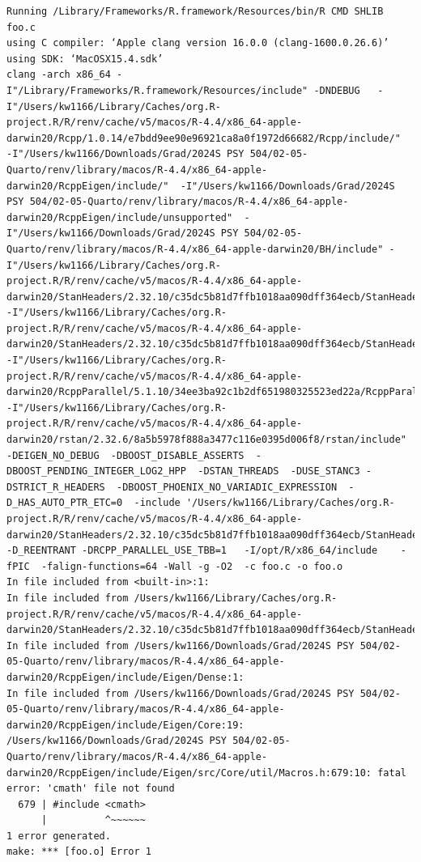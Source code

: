 \documentclass[
  letterpaper,
  DIV=11,
  numbers=noendperiod]{scrartcl}
\begin{document}
\begin{verbatim}
Running /Library/Frameworks/R.framework/Resources/bin/R CMD SHLIB foo.c
using C compiler: ‘Apple clang version 16.0.0 (clang-1600.0.26.6)’
using SDK: ‘MacOSX15.4.sdk’
clang -arch x86_64 -I"/Library/Frameworks/R.framework/Resources/include" -DNDEBUG   -I"/Users/kw1166/Library/Caches/org.R-project.R/R/renv/cache/v5/macos/R-4.4/x86_64-apple-darwin20/Rcpp/1.0.14/e7bdd9ee90e96921ca8a0f1972d66682/Rcpp/include/"  -I"/Users/kw1166/Downloads/Grad/2024S PSY 504/02-05-Quarto/renv/library/macos/R-4.4/x86_64-apple-darwin20/RcppEigen/include/"  -I"/Users/kw1166/Downloads/Grad/2024S PSY 504/02-05-Quarto/renv/library/macos/R-4.4/x86_64-apple-darwin20/RcppEigen/include/unsupported"  -I"/Users/kw1166/Downloads/Grad/2024S PSY 504/02-05-Quarto/renv/library/macos/R-4.4/x86_64-apple-darwin20/BH/include" -I"/Users/kw1166/Library/Caches/org.R-project.R/R/renv/cache/v5/macos/R-4.4/x86_64-apple-darwin20/StanHeaders/2.32.10/c35dc5b81d7ffb1018aa090dff364ecb/StanHeaders/include/src/"  -I"/Users/kw1166/Library/Caches/org.R-project.R/R/renv/cache/v5/macos/R-4.4/x86_64-apple-darwin20/StanHeaders/2.32.10/c35dc5b81d7ffb1018aa090dff364ecb/StanHeaders/include/"  -I"/Users/kw1166/Library/Caches/org.R-project.R/R/renv/cache/v5/macos/R-4.4/x86_64-apple-darwin20/RcppParallel/5.1.10/34ee3ba92c1b2df651980325523ed22a/RcppParallel/include/"  -I"/Users/kw1166/Library/Caches/org.R-project.R/R/renv/cache/v5/macos/R-4.4/x86_64-apple-darwin20/rstan/2.32.6/8a5b5978f888a3477c116e0395d006f8/rstan/include" -DEIGEN_NO_DEBUG  -DBOOST_DISABLE_ASSERTS  -DBOOST_PENDING_INTEGER_LOG2_HPP  -DSTAN_THREADS  -DUSE_STANC3 -DSTRICT_R_HEADERS  -DBOOST_PHOENIX_NO_VARIADIC_EXPRESSION  -D_HAS_AUTO_PTR_ETC=0  -include '/Users/kw1166/Library/Caches/org.R-project.R/R/renv/cache/v5/macos/R-4.4/x86_64-apple-darwin20/StanHeaders/2.32.10/c35dc5b81d7ffb1018aa090dff364ecb/StanHeaders/include/stan/math/prim/fun/Eigen.hpp'  -D_REENTRANT -DRCPP_PARALLEL_USE_TBB=1   -I/opt/R/x86_64/include    -fPIC  -falign-functions=64 -Wall -g -O2  -c foo.c -o foo.o
In file included from <built-in>:1:
In file included from /Users/kw1166/Library/Caches/org.R-project.R/R/renv/cache/v5/macos/R-4.4/x86_64-apple-darwin20/StanHeaders/2.32.10/c35dc5b81d7ffb1018aa090dff364ecb/StanHeaders/include/stan/math/prim/fun/Eigen.hpp:22:
In file included from /Users/kw1166/Downloads/Grad/2024S PSY 504/02-05-Quarto/renv/library/macos/R-4.4/x86_64-apple-darwin20/RcppEigen/include/Eigen/Dense:1:
In file included from /Users/kw1166/Downloads/Grad/2024S PSY 504/02-05-Quarto/renv/library/macos/R-4.4/x86_64-apple-darwin20/RcppEigen/include/Eigen/Core:19:
/Users/kw1166/Downloads/Grad/2024S PSY 504/02-05-Quarto/renv/library/macos/R-4.4/x86_64-apple-darwin20/RcppEigen/include/Eigen/src/Core/util/Macros.h:679:10: fatal error: 'cmath' file not found
  679 | #include <cmath>
      |          ^~~~~~~
1 error generated.
make: *** [foo.o] Error 1
\end{verbatim}
\end{document}
